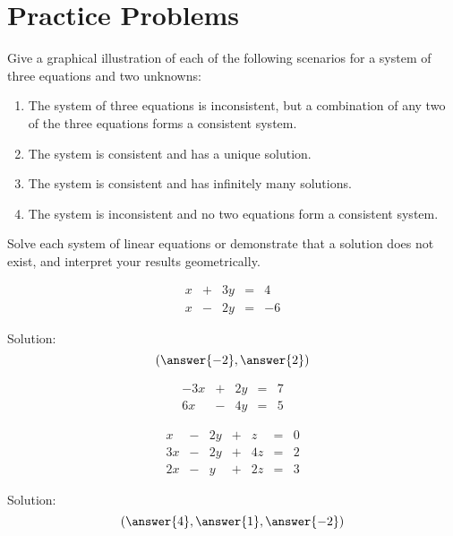 \documentclass{ximera}
\begin{document}




\section*{Practice Problems}
\begin{problem}
Give a graphical illustration of each of the following scenarios for a system of three equations and two unknowns:
  \begin{enumerate}
  \item The system of three equations is inconsistent, but a combination of any two of the three equations forms a consistent system.
  \item The system is consistent and has a unique solution.
  \item The system is consistent and has infinitely many solutions.
  \item The system is inconsistent and no two equations form a consistent system.
  \end{enumerate}
\end{problem}

\begin{problem} 
Solve each system of linear equations or demonstrate that a solution does not exist, and interpret your results geometrically.
  \begin{problem}
  $$\begin{array}{ccccc}
      x & +&3y&= &4 \\
	 x& -&2y&=&-6
    \end{array}$$
    
    Solution: $$(\answer{-2},\answer{2})$$
  \end{problem}
  
  \begin{problem}
  $$\begin{array}{ccccc}
      -3x & +&2y&= &7 \\
	 6x& -&4y&=&5
    \end{array}$$
  \end{problem}
  
  
  \begin{problem}
$$\begin{array}{ccccccc}
      x & -&2y&+&z&= &0 \\
	 3x& -&2y&+&4z&=&2\\
     2x& -&y&+&2z&=&3
    \end{array}$$
    
Solution:    $$(\answer{4},\answer{1},\answer{-2})$$
\end{problem}
\end{problem}
\end{document}

